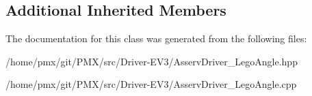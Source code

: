\subsection*{Additional Inherited Members}


The documentation for this class was generated from the following files\+:\begin{DoxyCompactItemize}
\item 
/home/pmx/git/\+P\+M\+X/src/\+Driver-\/\+E\+V3/Asserv\+Driver\+\_\+\+Lego\+Angle.\+hpp\item 
/home/pmx/git/\+P\+M\+X/src/\+Driver-\/\+E\+V3/Asserv\+Driver\+\_\+\+Lego\+Angle.\+cpp\end{DoxyCompactItemize}
